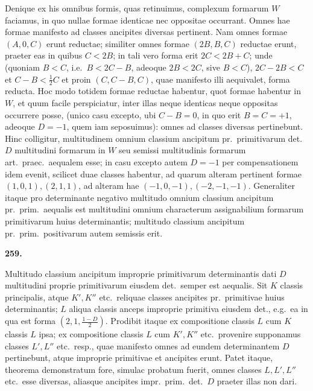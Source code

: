 \documentclass[12pt,a4paper]{article}
\theoremstyle{plain}
\theoremstyle{definition}
\theoremstyle{remark}
\begin{document}
Denique ex his omnibus formis, quas retinuimus, complexum formarum $W$ faciamus, in quo nullae formae identicae nec oppositae occurrant. Omnes hae formae manifesto ad classes ancipites diversas pertinent. Nam omnes formae $(A, 0, C)$ erunt reductae; similiter omnes formae $(2B, B, C)$ reductae erunt, praeter eas in quibus $C < 2B$; in tali vero forma erit $2C < 2B + C$; unde (quoniam $B < C$, i.e.\ $B < 2C - B$, adeoque $2B < 2C$, sive $B < C$), $2C - 2B < C$ et $C - B < \tfrac{1}{2}C$ et proin $(C, C - B, C)$, quae manifesto illi aequivalet, forma reducta. Hoc modo totidem formae reductae habentur, quot formae habentur in $W$, et quum facile perspiciatur, inter illas neque identicas neque oppositas occurrere posse, (unico casu excepto, ubi $C - B = 0$, in quo erit $B = C = +1$, adeoque $D = -1$, quem iam seposuimus): omnes ad classes diversas pertinebunt. Hinc colligitur, multitudinem omnium classium ancipitum pr.\ primitivarum det.\ $D$ multitudini formarum in $W$ seu semissi multitudinis formarum art.\ praec.\ aequalem esse; in casu excepto autem $D = -1$ per compensationem idem evenit, scilicet duae classes habentur, ad quarum alteram pertinent formae $(1, 0, 1), (2, 1, 1)$, ad alteram hae $(-1, 0, -1), (-2, -1, -1)$. Generaliter itaque pro determinante negativo multitudo omnium classium ancipitum pr.\ prim.\ aequalis est multitudini omnium characterum assignabilium formarum primitivarum huius determinantis; multitudo classium ancipitum pr.\ prim.\ positivarum autem semissis erit.

\begin{center}\textbf{259.}\end{center}

Multitudo classium ancipitum improprie primitivarum determinantis dati $D$ multitudini proprie primitivarum eiusdem det.\ semper est aequalis. Sit $K$ classis principalis, atque $K', K''$ etc.\ reliquae classes ancipites pr.\ primitivae huius determinantis; $L$ aliqua classis anceps improprie primitiva eiusdem det., e.g.\ ea in qua est forma $(2, 1, \tfrac{1-D}{2})$. Prodibit itaque ex compositione classis $L$ cum $K$ classis $L$ ipsa; ex compositione classis $L$ cum $K', K''$ etc.\ provenire supponamus classes $L', L''$ etc.\ resp., quae manifesto omnes ad eundem determinantem $D$ pertinebunt, atque improprie primitivae et ancipites erunt. Patet itaque, theorema demonstratum fore, simulac probatum fuerit, omnes classes $L, L', L''$ etc.\ esse diversas, aliasque ancipites impr.\ prim.\ det.\ $D$ praeter illas non dari.
\end{document}
